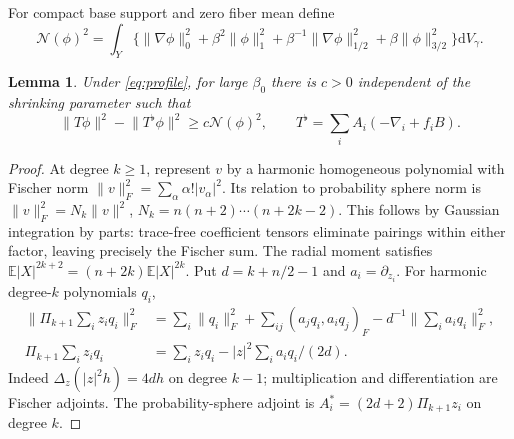 \documentclass[11pt]{article}
\newtheorem{lemma}[theorem]{Lemma}
\theoremstyle{definition}\newtheorem{definition}[theorem]{Definition}
\theoremstyle{remark}\newtheorem{remark}[theorem]{Remark}
\newcommand{\dd}{\mathrm d}
\newcommand{\vol}{\dd V}
\newcommand{\norm}[1]{\lVert #1\rVert}
\begin{document}
For compact base support and zero fiber mean define
\begin{equation}\label{eq:Nnorm}
 \mathcal N(\phi)^2=\int_Y\{\norm{\nabla\phi}_0^2+
 \beta^2\norm{\phi}_1^2+\beta^{-1}\norm{\nabla\phi}_{1/2}^2+
 \beta\norm{\phi}_{3/2}^2\}\vol_\gamma.
\end{equation}
\begin{lemma}\label{lem:model}
Under \eqref{eq:profile}, for large $\beta_0$ there is $c>0$ independent
of the shrinking parameter such that
\[
 \norm{T\phi}^2-\norm{T^\flat\phi}^2\ge c\mathcal N(\phi)^2,
 \qquad T^\flat=\sum_iA_i(-\nabla_i+f_iB).
\]
\end{lemma}
\begin{proof}
At degree $k\ge1$, represent $v$ by a harmonic homogeneous polynomial
with Fischer norm $\norm{v}_F^2=\sum_\alpha\alpha!|v_\alpha|^2$.
Its relation to probability sphere norm is
$\norm{v}_F^2=N_k\norm{v}^2$,
$N_k=n(n+2)\cdots(n+2k-2)$. This follows by Gaussian integration by parts:
trace-free coefficient tensors eliminate pairings within either factor,
leaving precisely the Fischer sum. The radial moment satisfies
$\mathbb E|X|^{2k+2}=(n+2k)\mathbb E|X|^{2k}$.
Put $d=k+n/2-1$ and $a_i=\partial_{z_i}$.
For harmonic degree-$k$ polynomials $q_i$,
\begin{align}\label{eq:projection}
 \norm{\Pi_{k+1}\textstyle\sum_i z_iq_i}_F^2
 &=\sum_i\norm{q_i}_F^2+\sum_{ij}(a_jq_i,a_iq_j)_F
               -d^{-1}\norm{\textstyle\sum_i a_iq_i}_F^2,\\[-2pt]
 \Pi_{k+1}\textstyle\sum_i z_iq_i
 &=\sum_i z_iq_i-|z|^2\sum_i a_iq_i/(2d).\nonumber
\end{align}
Indeed $\Delta_z(|z|^2h)=4dh$ on degree $k-1$; multiplication and
differentiation are Fischer adjoints. The probability-sphere adjoint is
$A_i^*=(2d+2)\Pi_{k+1}z_i$ on degree $k$.


\end{proof}
\end{document}
